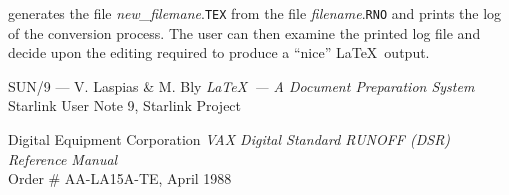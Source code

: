 generates the file {\it new\_filemane}.{\tt TEX} from the file {\it
filename}.{\tt RNO}  and prints the log of the conversion process.  The user
can then examine the printed log file and decide upon the editing required to
produce a ``nice'' \LaTeX\ output.

\begin{thebibliography}{99}


 SUN/9 --- V. Laspias \& M. Bly {\em \LaTeX\ --- A Document
Preparation  System} \\ Starlink User Note 9, Starlink Project


 Digital Equipment Corporation {\em VAX Digital Standard 
RUNOFF (DSR) Reference Manual } \\ Order \# AA-LA15A-TE, April 1988

\end{thebibliography}


